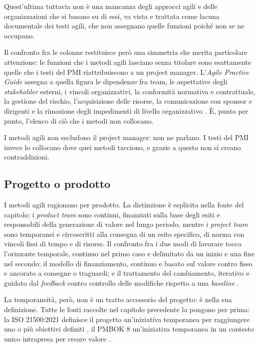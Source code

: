 Quest'ultima  tuttavia non \`e una mancanza degli approcci agili e delle organizzazioni
che si basano su di essi, va vista e trattata come lacuna documentale dei testi
agili, che non assegnano quelle funzioni poich\'e non se ne occupano.

Il confronto fra le colonne restituisce per\`o una simmetria che merita
particolare attenzione: le funzioni che i metodi agili lasciano senza titolare
sono esattamente quelle che i testi del
PMI riattribuiscono a un project manager. L'\emph{Agile Practice Guide}
assegna a quella figura le dipendenze fra team, le aspettative degli
\emph{stakeholder} esterni, i vincoli organizzativi, la conformit\`a normativa
e contrattuale, la gestione del rischio, l'acquisizione delle risorse, la
comunicazione con sponsor e dirigenti e la rimozione degli impedimenti di
livello organizzativo \cite{agilepracticeguide2}. \`E, punto per punto,
l'elenco di ci\`o che i metodi non collocano.

I metodi agili non escludono il project manager: non ne parlano. I testi del
PMI invece lo collocano dove quei metodi tacciono, e grazie a questo non si creano
contraddizioni.

\subsection{Progetto o prodotto}
\label{sec:progetto-prodotto}

I metodi agili ragionano per prodotto. La distinzione \`e esplicita nella fonte
del capitolo: i \emph{product team} sono continui, finanziati sulla base degli
esiti e responsabili della generazione di valore nel lungo periodo, mentre i
\emph{project team} sono temporanei e circoscritti alla consegna di un esito
specifico, di norma con vincoli fissi di tempo e di risorse. Il confronto fra i
due modi di lavorare tocca l'orizzonte temporale, continuo nel primo caso e
delimitato da un inizio e una fine nel secondo; il modello di finanziamento,
continuo e basato sul valore contro fisso e ancorato a consegne o traguardi; e
il trattamento del cambiamento, iterativo e guidato dal \emph{feedback} contro
controllo delle modifiche rispetto a una \emph{baseline}
\cite{agilepracticeguide2}.

La temporaneit\`a, per\`o, non \`e un tratto accessorio del progetto: \`e nella
sua definizione. Tutte le fonti raccolte nel capitolo precedente la pongono per
prima: la ISO 21500:2021 definisce il progetto un'iniziativa temporanea per
raggiungere uno o pi\`u obiettivi definiti \cite{iso21500-2021}, il PMBOK 8
un'iniziativa temporanea in un contesto unico intrapresa per creare valore
\cite{pmbok8}.

